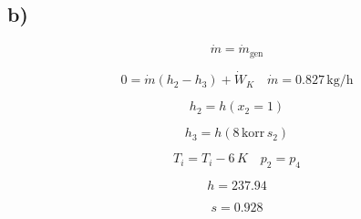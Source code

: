 

\subsection*{b)}

\[
\dot{m} = \dot{m}_{\text{gen}}
\]

\[
0 = \dot{m} (h_2 - h_3) + \dot{W}_K \quad \dot{m} = 0.827 \, \text{kg/h}
\]

\[
h_2 = h \left( x_2 = 1 \right)
\]

\[
h_3 = h \left( 8 \, \text{korr} \, s_2 \right)
\]

\[
T_i = T_i - 6 \, K \quad p_2 = p_4
\]

\[
h = 237.94
\]

\[
s = 0.928
\]